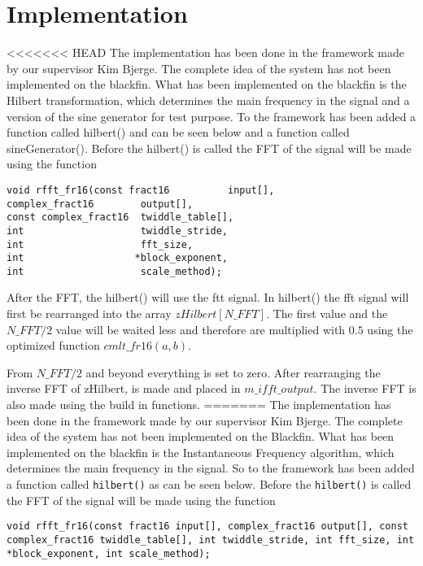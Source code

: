 
\section{Implementation}
\label{sec:impl}
<<<<<<< HEAD
The implementation has been done in the framework made by our supervisor Kim Bjerge. The complete idea of the system has not been implemented on the blackfin. What has been implemented on the blackfin is the Hilbert transformation, which determines the main frequency in the signal and a version of the sine generator for test purpose. 
To the framework has been added a function called hilbert() and can be seen below and a function called sineGenerator(). Before the hilbert() is called the FFT of the signal will be made using the function 
\begin{verbatim}
void rfft_fr16(const fract16          input[],
complex_fract16        output[],
const complex_fract16  twiddle_table[],
int                    twiddle_stride,
int                    fft_size,
int                   *block_exponent,
int                    scale_method);
\end{verbatim}
After the FFT, the hilbert() will use the ftt signal. In hilbert() the fft signal will first be rearranged into the array $zHilbert[N\_FFT]$. The first value and the $N\_FFT/2$ value will be waited less and therefore are multiplied with $0.5$ using the optimized function $cmlt\_fr16(a,b)$. 

From $N\_FFT/2$ and beyond everything is set to zero. 
After rearranging the inverse FFT of zHilbert, is made and placed in $m\_ifft\_output$. The inverse FFT is also made using the build in functions.
=======
The implementation has been done in the framework made by our supervisor Kim Bjerge.
The complete idea of the system has not been implemented on the Blackfin.
What has been implemented on the blackfin is the Instantaneous Frequency algorithm, which determines the main frequency in the signal.
So to the framework has been added a function called \texttt{hilbert()} as can be seen below.
Before the \texttt{hilbert()} is called the FFT of the signal will be made using the function 

\begin{verbatim}
void rfft_fr16(const fract16 input[], complex_fract16 output[], const complex_fract16 twiddle_table[], int twiddle_stride, int fft_size, int *block_exponent, int scale_method);
\end{verbatim}

